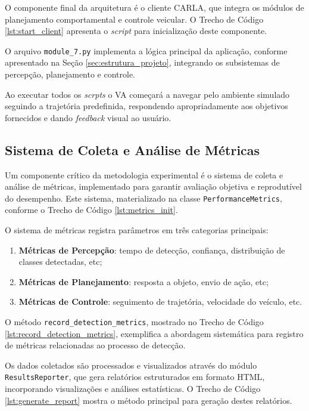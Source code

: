 O componente final da arquitetura é o cliente CARLA, que integra os módulos de planejamento comportamental e controle veicular. O Trecho de Código \ref{lst:start_client} apresenta o \textit{script} para inicialização deste componente.

O arquivo \texttt{module\_7.py} implementa a lógica principal da aplicação, conforme apresentado na Seção \ref{sec:estrutura_projeto}, integrando os subsistemas de percepção, planejamento e controle. 

Ao executar todos os \textit{scrpts} o VA começará a navegar pelo ambiente simulado seguindo a trajetória predefinida, respondendo apropriadamente aos objetivos fornecidos e dando \textit{feedback} visual ao usuário.

\subsection{Sistema de Coleta e Análise de Métricas} \label{subsec:coleta_analise}

Um componente crítico da metodologia experimental é o sistema de coleta e análise de métricas, implementado para garantir avaliação objetiva e reprodutível do desempenho. Este sistema, materializado na classe \texttt{PerformanceMetrics}, conforme o Trecho de Código \ref{lst:metrics_init}. 

O sistema de métricas registra parâmetros em três categorias principais:

\begin{enumerate}
    \item \textbf{Métricas de Percepção}: tempo de detecção, confiança, distribuição de classes detectadas, etc;
    \item \textbf{Métricas de Planejamento}: resposta a objeto, envio de ação, etc;
    \item \textbf{Métricas de Controle}: seguimento de trajetória, velocidade do veículo, etc.
\end{enumerate}

O método \texttt{record\_detection\_metrics}, mostrado no Trecho de Código \ref{lst:record_detection_metrics}, exemplifica a abordagem sistemática para registro de métricas relacionadas ao processo de detecção.

Os dados coletados são processados e visualizados através do módulo \texttt{ResultsReporter}, que gera relatórios estruturados em formato HTML, incorporando visualizações e análises estatísticas. O Trecho de Código \ref{lst:generate_report} mostra o método principal para geração destes relatórios.

